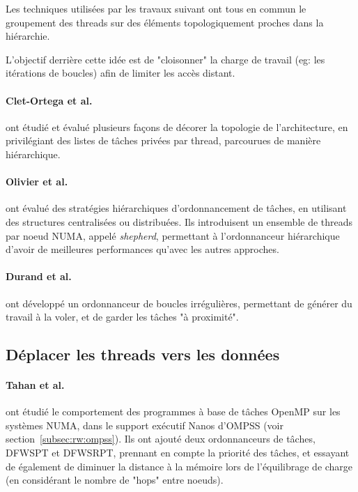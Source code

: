 Les techniques utilisées par les travaux suivant ont tous en commun le groupement des threads sur des éléments topologiquement proches dans la hiérarchie.

L'objectif derrière cette idée est de "cloisonner" la charge de travail (eg: les itérations de boucles) afin de limiter les accès distant.

\paragraph{Clet-Ortega et al.~\cite{Clet2014}} ont étudié et évalué plusieurs façons de décorer la topologie de l'architecture, en privilégiant des listes de tâches privées par thread, parcourues de manière hiérarchique.

\paragraph{Olivier et al.~\cite{Olivier2012}} ont évalué des stratégies hiérarchiques d'ordonnancement de tâches, en utilisant des structures centralisées ou distribuées.
Ils introduisent un ensemble de threads par noeud NUMA, appelé \emph{shepherd}, permettant à l'ordonnanceur hiérarchique d'avoir de meilleures performances qu'avec les autres approches.


\paragraph{Durand et al.~\cite{Durand2013}} ont développé un ordonnanceur de boucles irrégulières, permettant de générer du travail à la voler, et de garder les tâches "à proximité".




\subsection{Déplacer les threads vers les données}\label{sec:rw:numa:thread-data}







\paragraph{Tahan et al.~\cite{Tahan2014}} ont étudié le comportement des programmes à base de tâches OpenMP sur les systèmes NUMA, dans le support exécutif Nanos d'OMPSS (voir section~\ref{subsec:rw:ompss}).
Ils ont ajouté deux ordonnanceurs de tâches, DFWSPT et DFWSRPT, prennant en compte la priorité des tâches, et essayant de également de diminuer la distance à la mémoire lors de l'équilibrage de charge (en considérant le nombre de "hops" entre noeuds).

